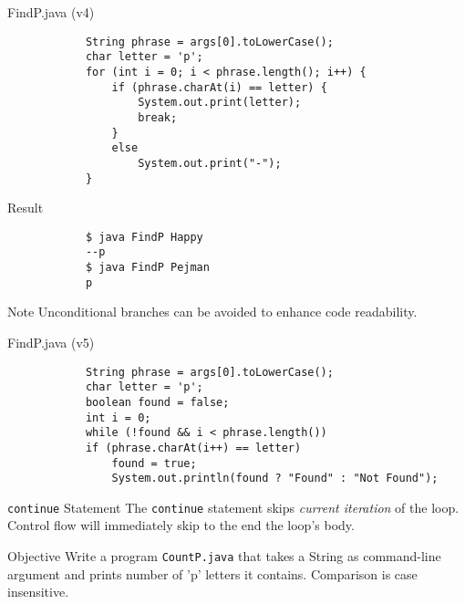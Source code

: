 \documentclass[10pt, compress]{beamer}
\begin{document}
\begin{slide}
	\begin{block}{FindP.java (v4)}
		\begin{verbatim}
			String phrase = args[0].toLowerCase();
			char letter = 'p';
			for (int i = 0; i < phrase.length(); i++) {
			    if (phrase.charAt(i) == letter) {
			        System.out.print(letter);
			        break;
			    }
			    else
			        System.out.print("-");
			}
		\end{verbatim}
	\end{block}
	\begin{block}{Result}
		\begin{verbatim}
			$ java FindP Happy
			--p
			$ java FindP Pejman
			p
		\end{verbatim}
	\end{block}
\end{slide}

\begin{slide}
	\begin{block}{Note}
	Unconditional branches can be avoided to enhance code readability.
	\end{block}
	\begin{block}{FindP.java (v5)}
		\begin{verbatim}
			String phrase = args[0].toLowerCase();
			char letter = 'p';
			boolean found = false;
			int i = 0;
			while (!found && i < phrase.length())
			if (phrase.charAt(i++) == letter)
			    found = true;
			    System.out.println(found ? "Found" : "Not Found");
		\end{verbatim}
	\end{block}
\end{slide}

\begin{slide}
	\begin{block}{\texttt{continue} Statement}
		The \texttt{continue} statement skips \emph{current iteration} of the loop.
		Control flow will immediately skip to the end the loop's body.
	\end{block}
\end{slide}

\begin{slide}
	\begin{block}{Objective}
		Write a program \texttt{CountP.java} that takes a String as command-line argument and prints number of 'p' letters it contains.
		Comparison is case insensitive.
	\end{block}
\end{slide}
\end{document}
